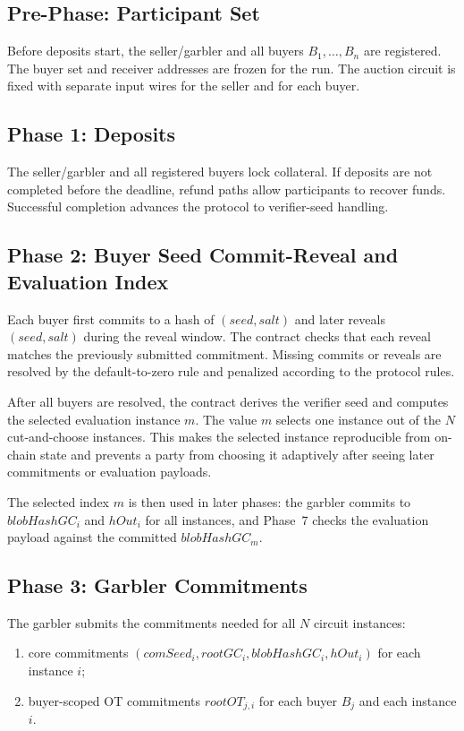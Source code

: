 \documentclass[final,twoside]{vutinfth}
\begin{document}
\subsection{Pre-Phase: Participant Set}
Before deposits start, the seller/garbler and all buyers $B_1,\dots,B_n$ are
registered. The buyer set and receiver addresses are frozen for the run. The
auction circuit is fixed with separate input wires for the seller and for each
buyer.

\subsection{Phase 1: Deposits}
The seller/garbler and all registered buyers lock collateral. If deposits are
not completed before the deadline, refund paths allow participants to recover
funds. Successful completion advances the protocol to verifier-seed handling.

\subsection{Phase 2: Buyer Seed Commit-Reveal and Evaluation Index}
Each buyer first commits to a hash of $(seed, salt)$ and later reveals
$(seed, salt)$ during the reveal window. The contract checks that each reveal
matches the previously submitted commitment. Missing commits or reveals are
resolved by the default-to-zero rule and penalized according to the protocol
rules.

After all buyers are resolved, the contract derives the verifier seed and
computes the selected evaluation instance $m$. The value $m$ selects one
instance out of the $N$ cut-and-choose instances. This makes the selected
instance reproducible from on-chain state and prevents a party from choosing it
adaptively after seeing later commitments or evaluation payloads.

The selected index $m$ is then used in later phases: the garbler commits to
$blobHashGC_i$ and $hOut_i$ for all instances, and Phase~7 checks the
evaluation payload against the committed $blobHashGC_m$.

\subsection{Phase 3: Garbler Commitments}
The garbler submits the commitments needed for all $N$ circuit instances:
\begin{enumerate}
\item core commitments $(comSeed_i, rootGC_i, blobHashGC_i, hOut_i)$ for each
instance $i$;
\item buyer-scoped OT commitments $rootOT_{j,i}$ for each buyer $B_j$ and each
instance $i$.
\end{enumerate}
\end{document}
